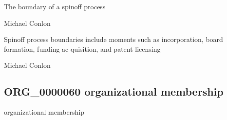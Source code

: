 \documentclass[letterpaper,10pt,english]{sphinxmanual}
\begin{document}
\begin{sphinxShadowBox}

\sphinxAtStartPar
{\hyperref[\detokenize{doc-BFO_0000035::doc}]{}}
\end{sphinxShadowBox}

\begin{sphinxShadowBox}

\sphinxAtStartPar
The boundary of a spin\sphinxhyphen{}off process
\end{sphinxShadowBox}

\begin{sphinxShadowBox}

\sphinxAtStartPar
Michael Conlon 
\end{sphinxShadowBox}

\begin{sphinxShadowBox}

\sphinxAtStartPar
Spin\sphinxhyphen{}off process boundaries include moments such as incorporation, board formation, funding ac quisition, and patent licensing
\end{sphinxShadowBox}

\begin{sphinxShadowBox}

\sphinxAtStartPar
Michael Conlon 
\end{sphinxShadowBox}
\begin{quote}

\ignorespaces \end{quote}


\subsection{ORG\_0000060 \sphinxhyphen{} organizational membership}
\label{\detokenize{doc-ORG_0000060:org-0000060-organizational-membership}}\label{\detokenize{doc-ORG_0000060:index-0}}\label{\detokenize{doc-ORG_0000060::doc}}
\begin{sphinxShadowBox}

\sphinxAtStartPar
organizational membership
\end{sphinxShadowBox}
\end{document}
